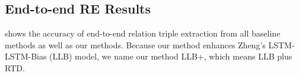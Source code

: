 %

\subsection{End-to-end RE Results}
 shows the accuracy of end-to-end relation triple extraction from
all baseline methods as well as our methods. Because our method enhances
Zheng's LSTM-LSTM-Bias (LLB) model, we name our method LLB+, which means
LLB plus RTD.

